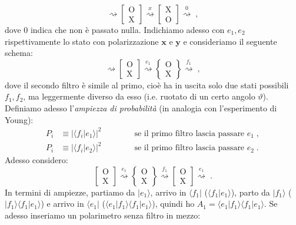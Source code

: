 \documentclass[10pt,a4paper]{report}
\theoremstyle{definition}
\numberwithin{equation}{section}
\newcommand{\bra}{\langle}
\newcommand{\ket}{\rangle}
\begin{document}
$$
\rightsquigarrow \left[
\begin{matrix}
\mathrm{O} \\
\mathrm{X}
\end{matrix}\right]\stackrel{x}{\rightsquigarrow}
\left[\begin{matrix}
\mathrm{X} \\
\mathrm{O}
\end{matrix}\right] \stackrel{0}{\rightsquigarrow}\;,
$$
dove $0$ indica che non è passato nulla. Indichiamo adesso con $e_1,e_2$ rispettivamente lo stato con polarizzazione $\mathbf{x}$ e $\mathbf{y}$ e consideriamo il seguente schema:
$$
\rightsquigarrow \left[
\begin{matrix}
\mathrm{O} \\
\mathrm{X}
\end{matrix}\right] \stackrel{e_1}{\rightsquigarrow}
\left\{ \begin{matrix}
\mathrm{O} \\
\mathrm{X}
\end{matrix}\right\} \stackrel{f_1}{\rightsquigarrow}\;,
$$
dove il secondo filtro è simile al primo, cioè ha in uscita solo due stati possibili $f_1,f_2$, ma leggermente diverso da esso (i.e. ruotato di un certo angolo $\vartheta$). Definiamo adesso l'\textit{ampiezza di probabilità} (in analogia con l'esperimento di Young):
\begin{align}
P_i &\equiv |\bra f_i|e_1\ket|^2 \qquad\qquad \mbox{se il primo filtro lascia passare $e_1$}\;, \\
P_i &\equiv |\bra f_i|e_2\ket|^2 \qquad\qquad \mbox{se il primo filtro lascia passare $e_2$}\;.
\end{align}
Adesso considero:
$$
\left[\begin{matrix}
\mathrm{O} \\
\mathrm{X}
\end{matrix}\right] \stackrel{e_1}{\rightsquigarrow} \left\{
\begin{matrix}
\mathrm{O} \\
\mathrm{X}
\end{matrix}\right\} \stackrel{f_1}{\rightsquigarrow} \left[
\begin{matrix}
\mathrm{O} \\
\mathrm{X}
\end{matrix}\right] \stackrel{e_1}{\rightsquigarrow}\;.
$$
In termini di ampiezze, partiamo da $|e_1\ket$, arrivo in $\bra f_1|$ ($\bra f_1|e_1\ket$), parto da $|f_1\ket$ ($|f_1\ket\bra f_1|e_1\ket$) e arrivo in $\bra e_1|$ ($\bra e_1|f_1\ket\bra f_1|e_1\ket$), quindi ho $A_1=\bra e_1|f_1\ket\bra f_1|e_1\ket$. Se adesso inseriamo un polarimetro senza filtro in mezzo:
\end{document}
